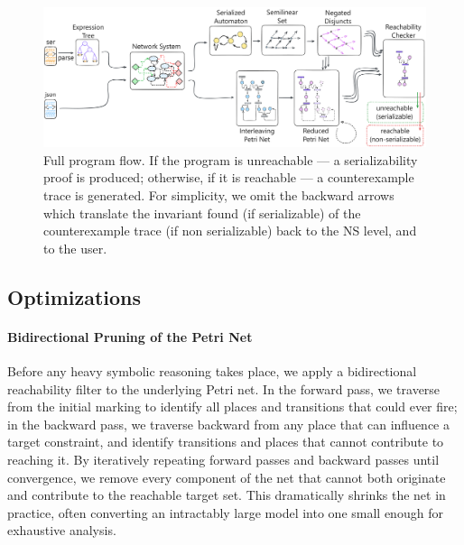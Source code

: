 \begin{figure}[htbp]
	\centering
	\includegraphics[width=1.0\textwidth]{plots/full_program_flow.pdf}
	\caption{Full program flow. If the program is unreachable --- a serializability proof is produced; otherwise, if it is reachable --- a counterexample trace is generated.
	For simplicity, we omit the backward arrows which translate the invariant found (if serializable) of the counterexample trace (if non serializable) back to the NS level, and to the user.}
	\label{fig:full_program_flow}
\end{figure}


\subsection{Optimizations}

\paragraph{Bidirectional Pruning of the Petri Net}
Before any heavy symbolic reasoning takes place, we apply a bidirectional reachability filter to the underlying Petri net.  In the forward pass, we traverse from the initial marking to identify all places and transitions that could ever fire; in the backward pass, we traverse backward from any place that can influence a target constraint, and identify transitions and places that cannot contribute to reaching it.  By iteratively repeating forward passes and backward passes until convergence, we remove every component of the net that cannot both originate and contribute to the reachable target set.  This dramatically shrinks the net in practice, often converting an intractably large model into one small enough for exhaustive analysis.

